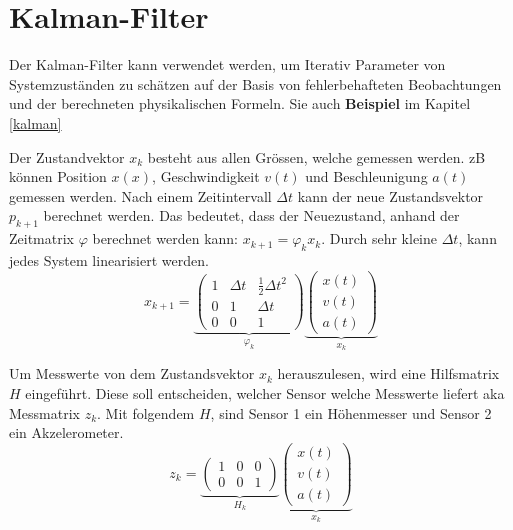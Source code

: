 \section{Kalman-Filter}
Der Kalman-Filter kann verwendet werden, um Iterativ Parameter von Systemzuständen zu schätzen auf der Basis von fehlerbehafteten Beobachtungen und der berechneten physikalischen Formeln. Sie auch \textbf{Beispiel} im Kapitel \ref{kalman}

Der Zustandvektor $x_k$ besteht aus allen Grössen, welche gemessen werden. zB können Position $x(x)$, Geschwindigkeit $v(t)$ und Beschleunigung $a(t)$ gemessen werden. Nach einem Zeitintervall $\Delta t$ kann der neue Zustandsvektor $p_{k+1}$ berechnet werden. Das bedeutet, dass der Neuezustand, anhand der Zeitmatrix $\varphi$ berechnet werden kann: $x_{k+1} = \varphi_kx_k$. Durch sehr kleine $\Delta t$, kann jedes System linearisiert werden.
\[
x_{k+1} = \underbrace{\begin{pmatrix}
	1 & \Delta t & \frac{1}{2}\Delta t^2 \\
	0 & 1 & \Delta t \\
	0 & 0 & 1
\end{pmatrix}}_{\varphi_k}\underbrace{\begin{pmatrix}
x(t) \\ v(t) \\ a(t)
\end{pmatrix}}_{x_k}
\]

Um Messwerte von dem Zustandsvektor $x_k$ herauszulesen, wird eine Hilfsmatrix $H$ eingeführt. Diese soll entscheiden, welcher Sensor welche Messwerte liefert aka Messmatrix $z_k$. Mit folgendem $H$, sind Sensor 1 ein Höhenmesser und Sensor 2 ein Akzelerometer.
\[
 z_k = \underbrace{\begin{pmatrix} 	1 & 0 & 0 \\ 0 & 0 & 1 \end{pmatrix}}_{H_k} \underbrace{\begin{pmatrix}
 		x(t) \\ v(t) \\ a(t)
 \end{pmatrix}}_{x_k}
\]

